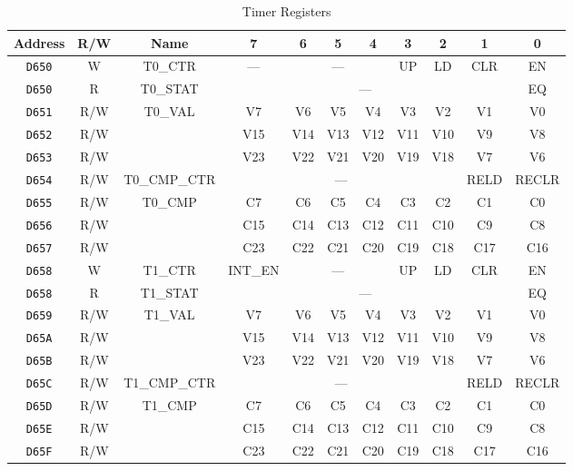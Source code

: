 \begin{table}[ht]
    \begin{center}
        \begin{tabular}{|c|c|c|c|c|c|c|c|c|c|c|} \hline
            Address & R/W & Name & 7 & 6 & 5 & 4 & 3 & 2 & 1 & 0 \\\hline\hline
			\verb+D650+ & W & T0\_CTR & --- & \multicolumn{3}{|c|}{---} & UP & LD & CLR & EN \\ \hline
			\verb+D650+ & R & T0\_STAT & \multicolumn{7}{|c|}{---} & EQ \\ \hline

			\verb+D651+ & R/W & \multirow{3}{*}{T0\_VAL} & V7 & V6 & V5 & V4 & V3 & V2 & V1 & V0 \\ \cline{1-2}\cline{4-11}
			\verb+D652+ & R/W &  & V15 & V14 & V13 & V12 & V11 & V10 & V9 & V8 \\ \cline{1-2}\cline{4-11}
			\verb+D653+ & R/W &  & V23 & V22 & V21 & V20 & V19 & V18 & V7 & V6 \\ \hline

			\verb+D654+ & R/W & T0\_CMP\_CTR & \multicolumn{6}{|c|}{---} & RELD & RECLR \\ \hline

			\verb+D655+ & R/W & \multirow{3}{*}{T0\_CMP} & C7 & C6 & C5 & C4 & C3 & C2 & C1 & C0 \\ \cline{1-2}\cline{4-11}
			\verb+D656+ & R/W &  & C15 & C14 & C13 & C12 & C11 & C10 & C9 & C8 \\ \cline{1-2}\cline{4-11}
			\verb+D657+ & R/W &  & C23 & C22 & C21 & C20 & C19 & C18 & C17 & C16 \\ \hline\hline

			\verb+D658+ & W & T1\_CTR & INT\_EN & \multicolumn{3}{|c|}{---} & UP & LD & CLR & EN \\ \hline
			\verb+D658+ & R & T1\_STAT & \multicolumn{7}{|c|}{---} & EQ \\ \hline

			\verb+D659+ & R/W & \multirow{3}{*}{T1\_VAL} & V7 & V6 & V5 & V4 & V3 & V2 & V1 & V0 \\ \cline{1-2}\cline{4-11}
			\verb+D65A+ & R/W &  & V15 & V14 & V13 & V12 & V11 & V10 & V9 & V8 \\ \cline{1-2}\cline{4-11}
			\verb+D65B+ & R/W &  & V23 & V22 & V21 & V20 & V19 & V18 & V7 & V6 \\ \hline

			\verb+D65C+ & R/W & T1\_CMP\_CTR & \multicolumn{6}{|c|}{---} & RELD & RECLR \\ \hline

			\verb+D65D+ & R/W & \multirow{3}{*}{T1\_CMP} & C7 & C6 & C5 & C4 & C3 & C2 & C1 & C0 \\ \cline{1-2}\cline{4-11}
			\verb+D65E+ & R/W &  & C15 & C14 & C13 & C12 & C11 & C10 & C9 & C8 \\ \cline{1-2}\cline{4-11}
			\verb+D65F+ & R/W &  & C23 & C22 & C21 & C20 & C19 & C18 & C17 & C16 \\ \hline
        \end{tabular}
    \end{center}
    \caption{Timer Registers}
    \label{tab:timer_reg}
\end{table}

